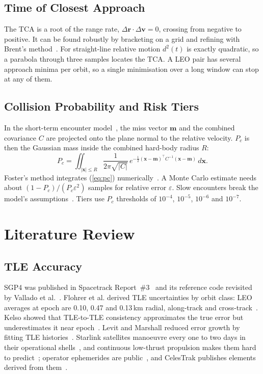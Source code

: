\documentclass[conference]{IEEEtran}
\begin{document}
\subsection{Time of Closest Approach}
The TCA is a root of the range rate, $\Delta\mathbf r\cdot\Delta\mathbf v=0$, crossing from negative to positive. It can be found robustly by bracketing on a grid and refining with Brent's method~\cite{brent1973}. For straight-line relative motion $d^2(t)$ is exactly quadratic, so a parabola through three samples locates the TCA. A LEO pair has several approach minima per orbit, so a single minimisation over a long window can stop at any of them.

\subsection{Collision Probability and Risk Tiers}
In the short-term encounter model~\cite{akella2000,chan2008}, the miss vector $\mathbf m$ and the combined covariance $C$ are projected onto the plane normal to the relative velocity. $P_c$ is then the Gaussian mass inside the combined hard-body radius $R$:
\begin{equation}
P_c=\iint_{|\mathbf x|\le R}\frac{1}{2\pi\sqrt{|C|}}\,e^{-\frac12(\mathbf x-\mathbf m)^{\!\top}C^{-1}(\mathbf x-\mathbf m)}\,d\mathbf x .
\label{eq:pc}
\end{equation}
Foster's method integrates (\ref{eq:pc}) numerically~\cite{foster1992}. A Monte Carlo estimate needs about $(1-P_c)/(P_c\varepsilon^2)$ samples for relative error $\varepsilon$. Slow encounters break the model's assumptions~\cite{coppola2012,alfano2009mc}. Tiers use $P_c$ thresholds of $10^{-4}$, $10^{-5}$, $10^{-6}$ and $10^{-7}$.

\section{Literature Review}

\subsection{TLE Accuracy}
SGP4 was published in Spacetrack Report~\#3~\cite{hoots1980str3} and its reference code revisited by Vallado et al.~\cite{vallado2006revisiting}. Flohrer et al. derived TLE uncertainties by orbit class: LEO averages at epoch are 0.10, 0.47 and 0.13\,km radial, along-track and cross-track~\cite{flohrer2009improving}. Kelso showed that TLE-to-TLE consistency approximates the true error but underestimates it near epoch~\cite{kelso2007validation}. Levit and Marshall reduced error growth by fitting TLE histories~\cite{levit2011improved}. Starlink satellites manoeuvre every one to two days in their operational shells~\cite{liu2024maneuver}, and continuous low-thrust propulsion makes them hard to predict~\cite{lang2025starlink}; operator ephemerides are public~\cite{ou2025starlink}, and CelesTrak publishes elements derived from them~\cite{celestrak_supgp}.
\end{document}
